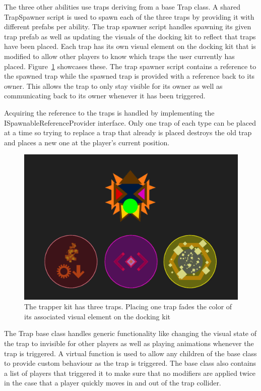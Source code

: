 The three other abilities use traps deriving from a base Trap class. A shared TrapSpawner script is used to spawn each of the three traps by providing it with different prefabs per ability. 
The trap spawner script handles spawning its given trap prefab as well as updating the visuals of the docking kit to reflect that traps have been placed. Each trap has its own visual element on the docking kit that is modified to allow other players to know which traps the user currently has placed. Figure~\ref{fig:trapperKit} showcases these.
The trap spawner script contains a reference to the spawned trap while the spawned trap is provided with a reference back to its owner. This allows the trap to only stay visible for its owner as well as communicating back to its owner whenever it has been triggered. 

Acquiring the reference to the traps is handled by implementing the ISpawnableReferenceProvider interface. Only one trap of each type can be placed at a time so trying to replace a trap that already is placed destroys the old trap and places a new one at the player's current position.  

\begin{figure}[tbph]  %
  \centering
  \includegraphics[width=.75\textwidth]{images/TrapperKitWithTraps}
  \caption[The trapper kit with its three traps]{The trapper kit has three traps. Placing one trap fades the color of its associated visual element on the docking kit}
  \label{fig:trapperKit}
\end{figure}

The Trap base class handles generic functionality like changing the visual state of the trap to invisible for other players as well as playing animations whenever the trap is triggered. A virtual function is used to allow any children of the base class to provide custom behaviour as the trap is triggered. The base class also contains a list of players that triggered it to make sure that no modifiers are applied twice in the case that a player quickly moves in and out of the trap collider. 

